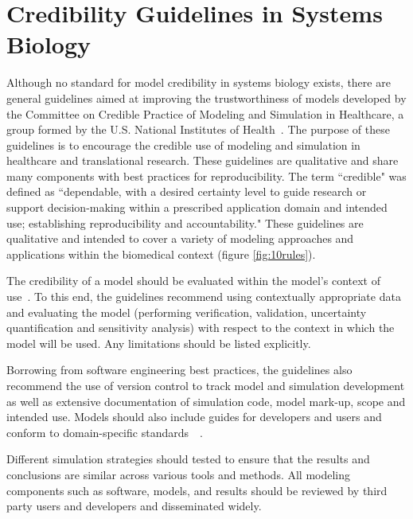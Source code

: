 \documentclass[12pt]{report}
\begin{document}
\section{Credibility Guidelines in Systems Biology}

Although no standard for model credibility in systems biology exists, there are general guidelines aimed at improving the trustworthiness of models developed by the Committee on Credible Practice of Modeling and Simulation in Healthcare, a group formed by the U.S. National Institutes of Health~\cite{erdemir_credible_2020}. The purpose of these guidelines is to encourage the credible use of modeling and simulation in healthcare and translational research. These guidelines are qualitative and share many components with best practices for reproducibility. The term ``credible" was defined as  ``dependable, with a desired certainty level to guide research or support decision-making within a prescribed application domain and intended use; establishing reproducibility and accountability." These guidelines are qualitative and intended to cover a variety of modeling approaches and applications within the biomedical context (figure \ref{fig:10rules}). 

The credibility of a model should be evaluated within the model's context of use~\cite{erdemir_credible_2020}.
 To this end, the guidelines recommend using contextually appropriate data and evaluating the model (performing verification, validation, uncertainty quantification and sensitivity analysis) with respect to the context in which the model will be used. Any limitations should be listed explicitly. 

Borrowing from software engineering best practices, the guidelines also recommend the use of version control to track model and simulation development as well as extensive documentation of simulation code, model mark-up, scope and intended use. Models should also include guides for developers and users and conform to domain-specific standards~~\cite{erdemir_credible_2020}.

Different simulation strategies should tested to ensure that the results and conclusions are similar across various tools and methods. All modeling components such as software, models, and results should be reviewed by third party users and developers and disseminated widely.  
\end{document}
